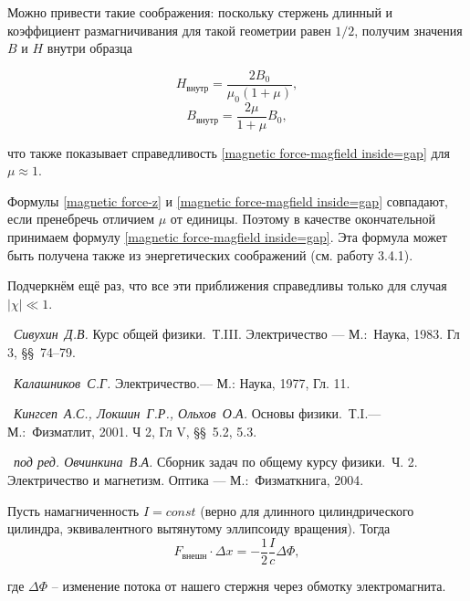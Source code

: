 Можно привести такие соображения: поскольку стержень длинный и коэффициент размагничивания для такой геометрии равен $1/2$,  получим значения $B$ и $H$ внутри образца

\begin{equation*}
H_{\text{внутр}} = \frac{2B_0}{\mu_0 (1 + \mu)},
\end{equation*}
\begin{equation*}
B_{\text{внутр}} = \frac{2\mu}{1 + \mu} B_0,
\end{equation*}

что также показывает справедливость \eqref{magnetic force-magfield inside=gap} для $\mu \approx 1$.

Формулы \eqref{magnetic force-z} и \eqref{magnetic force-magfield inside=gap} совпадают, если пренебречь отличием $\mu$ от единицы. Поэтому в качестве окончательной принимаем формулу \eqref{magnetic force-magfield inside=gap}. Эта формула может быть получена также из энергетических соображений (см. работу 3.4.1).

Подчеркнём ещё раз, что все эти приближения справедливы только для случая $|\chi| \ll 1$.

\begin{lab:literature}
	\item~\emph{Сивухин~Д.В.} Курс общей физики.~Т.III. Электричество --- М.:~Наука, 1983. Гл 3, \S\S~74--79.
	\item~\emph{Калашников~С.Г.} Электричество.--- М.: Наука, 1977, Гл. 11.
	\item~\emph{Кингсеп~А.С., Локшин~Г.Р., Ольхов~О.А.} Основы физики.~Т.I.--- М.:~Физматлит, 2001. Ч 2, Гл V, \S\S~5.2, 5.3.
	\item~\emph{под ред. Овчинкина~В.А.} Сборник задач по общему курсу физики.~Ч. 2. Электричество и магнетизм. Оптика --- М.:~Физматкнига, 2004.
\end{lab:literature}


Пусть намагниченность $I = const$ (верно для длинного цилиндрического цилиндра, эквивалентного вытянутому эллипсоиду вращения).
Тогда
\begin{equation*}
F_{\text{внешн}} \cdot \Delta x = - \frac{1}{2} \frac{I}{c} \Delta \Phi,
\end{equation*}

где $\Delta \Phi$ -- изменение потока от нашего стержня через обмотку электромагнита.

